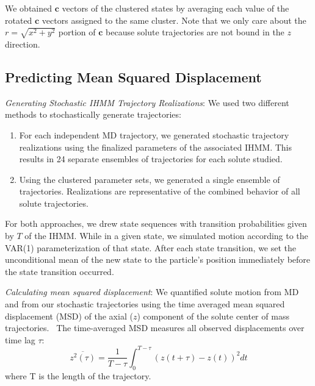 \documentclass[journal=jpcbfk,manuscript=article]{achemso}
\begin{document}
  We obtained $\mathbf{c}$ vectors of the clustered states by averaging each 
  value of the rotated $\mathbf{c}$ vectors assigned to the same cluster. Note
  that we only care about the $r=\sqrt{x^2+y^2}$ portion of $\mathbf{c}$ because
  solute trajectories are not bound in the $z$ direction.
  
  \subsection{Predicting Mean Squared Displacement}\label{method:realizations}
  \textit{Generating Stochastic IHMM Trajectory Realizations}: We used two 
  different methods to stochastically generate trajectories:
  \begin{enumerate}[label={Method \theenumi :}, leftmargin=3.5\parindent]
    \item For each independent MD trajectory, we generated stochastic trajectory
    realizations using the finalized parameters of the associated IHMM. This 
    results in 24 separate ensembles of trajectories for each solute studied. 
    \item Using the clustered parameter sets, we generated a single ensemble
	of trajectories. Realizations are representative of the combined behavior
	of all solute trajectories.
  \end{enumerate}
  
  For both approaches, we drew state sequences with transition probabilities given 
  by $T$ of the IHMM. While in a given state, we simulated motion according to the 
  VAR(1) parameterization of that state. After each state transition, we set the 
  unconditional mean of the new state to the particle's position immediately before
  the state transition occurred.
  
  \textit{Calculating mean squared displacement}: We quantified solute motion from
  MD and from our stochastic trajectories using the time averaged mean squared 
  displacement (MSD) of the axial ($z$) component of the solute center of mass
  trajectories.~\cite{meroz_toolbox_2015} The time-averaged MSD measures all observed 
  displacements over time lag $\tau$:
  \begin{equation}
  	\overline{z^2(\tau)} = \dfrac{1}{T - \tau}\int_{0}^{T - \tau} (z(t + \tau) - z(t))^2 dt
  \label{eqn:tamsd}
  \end{equation}
  where T is the length of the trajectory. 
  
\end{document}
